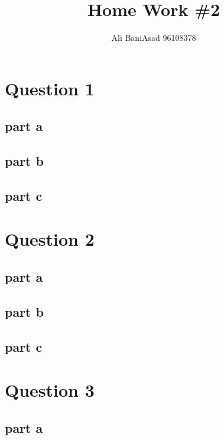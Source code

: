 \documentclass{article}
\title{Home Work \#2}
\author{Ali BaniAsad 96108378}
\begin{document}
	\maketitle
	\section{Question 1}
	
	\subsection{part a}
	
	\subsection{part b}\label{Q1_b}
	
	\subsection{part c}
	
	\section{Question 2}
	\subsection{part a}
	
	\subsection{part b}
	
	\subsection{part c}
	
	\section{Question 3}
	
	\subsection{part a}
	
	\newpage
	\tableofcontents
\end{document}
